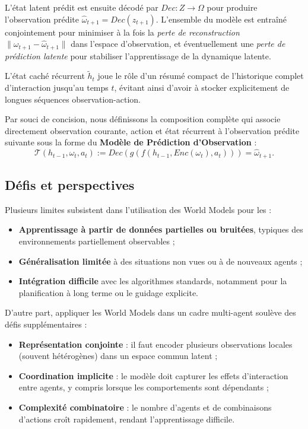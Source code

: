 L'état latent prédit est ensuite décodé par $Dec: Z \rightarrow \Omega$ pour produire l'observation prédite $\hat{\omega}_{t+1} = Dec(z_{t+1})$. L'ensemble du modèle est entraîné conjointement pour minimiser à la fois la \emph{perte de reconstruction} $\|\omega_{t+1} - \hat{\omega}_{t+1}\|$ dans l'espace d'observation, et éventuellement une \emph{perte de prédiction latente} pour stabiliser l'apprentissage de la dynamique latente.

L'état caché récurrent $\tilde{h}_t$ joue le rôle d'un résumé compact de l'historique complet d'interaction jusqu'au temps $t$, évitant ainsi d'avoir à stocker explicitement de longues séquences observation-action.

Par souci de concision, nous définissons la composition complète qui associe directement observation courante, action et état récurrent à l'observation prédite suivante sous la forme du \textbf{Modèle de Prédiction d'Observation} :
\[
    \mathcal{T}(h_{t-1}, \omega_t, a_t) := Dec(g(f(h_{t-1}, Enc(\omega_t), a_t))) = \hat{\omega}_{t+1}.
\]



\subsection{Défis et perspectives}

Plusieurs limites subsistent dans l'utilisation des World Models pour les  :
\begin{itemize}
    \item \textbf{Apprentissage à partir de données partielles ou bruitées}, typiques des environnements partiellement observables ;
    \item \textbf{Généralisation limitée} à des situations non vues ou à de nouveaux agents ;
    \item \textbf{Intégration difficile} avec les algorithmes  standards, notamment pour la planification à long terme ou le guidage explicite.
\end{itemize}

D'autre part, appliquer les World Models dans un cadre multi-agent soulève des défis supplémentaires :
\begin{itemize}
    \item \textbf{Représentation conjointe} : il faut encoder plusieurs observations locales (souvent hétérogènes) dans un espace commun latent ;
    \item \textbf{Coordination implicite} : le modèle doit capturer les effets d'interaction entre agents, y compris lorsque les comportements sont dépendants ;
    \item \textbf{Complexité combinatoire} : le nombre d'agents et de combinaisons d'actions croît rapidement, rendant l'apprentissage difficile.
\end{itemize}

